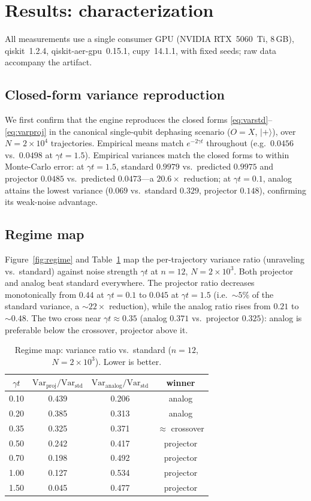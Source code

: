 \documentclass{ieeeaccess}
\newcommand{\ket}[1]{\lvert #1 \rangle}
\begin{document}
\section{Results: characterization}\label{sec:results}
All measurements use a single consumer GPU (NVIDIA RTX~5060~Ti, 8\,GB), qiskit~1.2.4,
qiskit-aer-gpu~0.15.1, cupy~14.1.1, with fixed seeds; raw data accompany the artifact.

\subsection{Closed-form variance reproduction}
We first confirm that the engine reproduces the closed forms \eqref{eq:varstd}--\eqref{eq:varproj}
in the canonical single-qubit dephasing scenario ($O=X$, $\ket{+}$), over $N=2\times10^4$
trajectories. Empirical means match $e^{-2\gamma t}$ throughout (e.g.\ $0.0456$ vs.\ $0.0498$ at
$\gamma t=1.5$). Empirical variances match the closed forms to within Monte-Carlo error: at
$\gamma t=1.5$, standard $0.9979$ vs.\ predicted $0.9975$ and projector $0.0485$ vs.\ predicted
$0.0473$---a $20.6\times$ reduction; at $\gamma t=0.1$, analog attains the lowest variance
($0.069$ vs.\ standard $0.329$, projector $0.148$), confirming its weak-noise advantage.

\subsection{Regime map}
Figure~\ref{fig:regime} and Table~\ref{tab:regime} map the per-trajectory variance ratio
(unraveling vs.\ standard) against noise strength $\gamma t$ at $n=12$, $N=2\times10^3$. Both
projector and analog beat standard everywhere. The projector ratio decreases monotonically from
$0.44$ at $\gamma t=0.1$ to $0.045$ at $\gamma t=1.5$ (i.e.\ $\sim\!5\%$ of the standard variance,
a $\sim\!22\times$ reduction), while the analog ratio rises from $0.21$ to $\sim\!0.48$. The two
cross near $\gamma t\approx0.35$ (analog $0.371$ vs.\ projector $0.325$): analog is preferable
below the crossover, projector above it.

\begin{table}[t]
\caption{Regime map: variance ratio vs.\ standard ($n=12$, $N=2\times10^3$). Lower is better.}
\label{tab:regime}
\centering
\begin{tabular}{cccc}
\toprule
$\gamma t$ & $\mathrm{Var}_{\mathrm{proj}}/\mathrm{Var}_{\mathrm{std}}$ &
$\mathrm{Var}_{\mathrm{analog}}/\mathrm{Var}_{\mathrm{std}}$ & winner \\
\midrule
0.10 & 0.439 & 0.206 & analog \\
0.20 & 0.385 & 0.313 & analog \\
0.35 & 0.325 & 0.371 & $\approx$ crossover \\
0.50 & 0.242 & 0.417 & projector \\
0.70 & 0.198 & 0.492 & projector \\
1.00 & 0.127 & 0.534 & projector \\
1.50 & 0.045 & 0.477 & projector \\
\bottomrule
\end{tabular}
\end{table}
\end{document}
